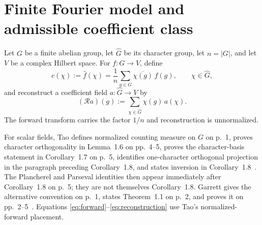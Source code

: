 \documentclass[11pt]{article}
\begin{document}
\section{Finite Fourier model and admissible coefficient class}
Let $G$ be a finite abelian group, let $\widehat G$ be its character group, let $n=|G|$, and let
$V$ be a complex Hilbert space.  For $f:G\to V$, define
\begin{equation}
  c(\chi):=\widehat f(\chi)
  =\frac{1}{n}\sum_{g\in G}\overline{\chi(g)}\,f(g),
  \qquad \chi\in\widehat G,
  \label{eq:forward}
\end{equation}
and reconstruct a coefficient field $a:\widehat G\to V$ by
\begin{equation}
  (\mathcal R a)(g)
  :=\sum_{\chi\in\widehat G}\chi(g)\,a(\chi).
  \label{eq:reconstruction}
\end{equation}
The forward transform carries the factor $1/n$ and reconstruction is unnormalized.

For scalar fields, Tao defines normalized counting measure on $G$ on p.~1, proves character
orthogonality in Lemma~1.6 on pp.~4--5, proves the character-basis statement in Corollary~1.7 on
p.~5, identifies one-character orthogonal projection in the paragraph preceding Corollary~1.8,
and states inversion in Corollary~1.8~\cite{Tao2007FiniteAbelian}.  The Plancherel and Parseval
identities then appear immediately after Corollary~1.8 on p.~5; they are not themselves
Corollary~1.8.  Garrett gives the alternative convention on p.~1, states Theorem~1.1 on p.~2, and
proves it on pp.~2--5~\cite{Garrett2019FiniteAbelian}.  Equations
\eqref{eq:forward}--\eqref{eq:reconstruction} use Tao's normalized-forward placement.
\end{document}
